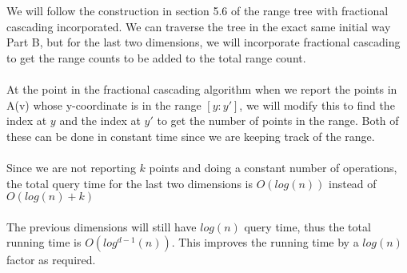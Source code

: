 \documentclass[11pt,psfig]{article}
\begin{document}
We will follow the construction in section 5.6 of the range tree with fractional cascading incorporated. We can traverse the tree in the exact same initial way Part B, but for the last two dimensions, we will incorporate fractional cascading to get the range counts to be added to the total range count. \\
\\
At the point in the fractional cascading algorithm when we report the points in A(v) whose y-coordinate is in the range $[y:y']$, we will modify this to find the index at $y$ and the index at $y'$ to get the number of points in the range. Both of these can be done in constant time since we are keeping track of the range. \\
\\
Since we are not reporting $k$ points and doing a constant number of operations, the total query time for the last two dimensions is $O(log(n))$ instead of $O(log(n) + k)$\\
\\
The previous dimensions will still have $log(n)$ query time, thus the total running time is $O(log^{d-1}(n))$. This improves the running time by a $log(n)$ factor as required. 
\end{document}
